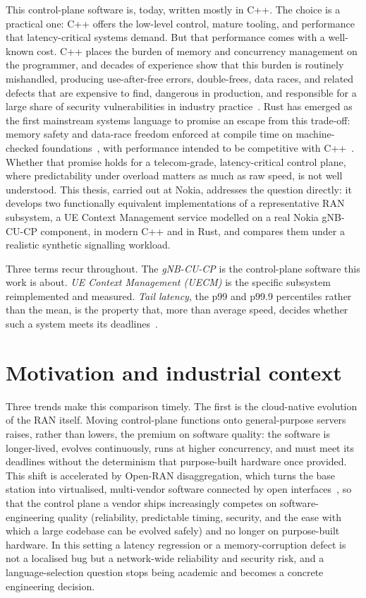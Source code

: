 \documentclass[english,twoside,openright,a4paper,censored,csm,software-track-2020]{HYthesisML}
\begin{document}
This control-plane software is, today, written mostly in C++. The choice is a
practical one: C++ offers the low-level control, mature tooling, and performance that
latency-critical systems demand. But that performance comes with a well-known cost. C++
places the burden of memory and concurrency management on the programmer, and decades of
experience show that this burden is routinely mishandled, producing use-after-free errors,
double-frees, data races, and related defects that are expensive to find, dangerous in
production, and responsible for a large share of security vulnerabilities in industry
practice~\cite{msrc2019memory,google2022android}. Rust has emerged as the first mainstream
systems language to promise an escape from this trade-off: memory safety and data-race
freedom enforced at compile time on machine-checked
foundations~\cite{klabnik2023rust,jung2018rustbelt}, with performance intended to be
competitive with C++~\cite{balasubramanian2017rust}. Whether that promise holds for a
telecom-grade, latency-critical control plane, where predictability under overload matters
as much as raw speed, is not well understood. This thesis, carried out at Nokia, addresses
the question directly: it develops two functionally equivalent implementations of a
representative RAN subsystem, a UE Context Management service modelled on a real Nokia
gNB-CU-CP component, in modern C++ and in Rust, and compares them under a realistic
synthetic signalling workload.


Three terms recur throughout. The \emph{gNB-CU-CP} is the control-plane software this work is
about. \emph{UE Context Management (UECM)} is the specific subsystem reimplemented and measured.
\emph{Tail latency}, the p99 and p99.9 percentiles rather than the mean, is the property that,
more than average speed, decides whether such a system meets its
deadlines~\cite{dean2013tail,barroso2017microseconds}.


\section{Motivation and industrial context}\label{sec:motivation}
Three trends make this comparison timely. The first is the cloud-native evolution of the RAN
itself. Moving control-plane functions onto general-purpose servers raises, rather than
lowers, the premium on software quality: the software is longer-lived, evolves continuously,
runs at higher concurrency, and must meet its deadlines without the determinism that
purpose-built hardware once provided. This shift is accelerated by Open-RAN disaggregation,
which turns the base station into virtualised, multi-vendor software connected by open
interfaces~\cite{polese2023oran}, so that the control plane a vendor ships increasingly
competes on software-engineering quality (reliability, predictable timing, security, and the
ease with which a large codebase can be evolved safely) and no longer on purpose-built hardware. In
this setting a latency regression or a memory-corruption defect is not a localised bug but a
network-wide reliability and security risk, and a language-selection question stops being
academic and becomes a concrete engineering decision.
\end{document}
